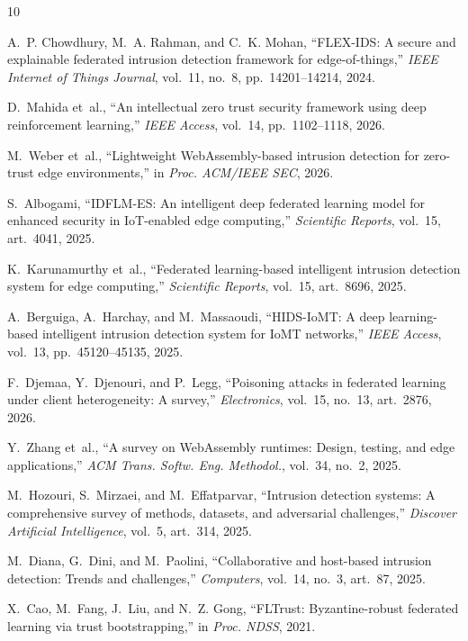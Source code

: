 \documentclass[11pt,a4paper]{article}
\begin{document}
\begin{thebibliography}{10}
\raggedright

A.~P. Chowdhury, M.~A. Rahman, and C.~K. Mohan, ``FLEX-IDS: A secure and explainable federated intrusion detection framework for edge-of-things,'' \emph{IEEE Internet of Things Journal}, vol.~11, no.~8, pp.~14201--14214, 2024.

D.~Mahida et~al., ``An intellectual zero trust security framework using deep reinforcement learning,'' \emph{IEEE Access}, vol.~14, pp.~1102--1118, 2026.

M.~Weber et~al., ``Lightweight WebAssembly-based intrusion detection for zero-trust edge environments,'' in \emph{Proc. ACM/IEEE SEC}, 2026.

S.~Albogami, ``IDFLM-ES: An intelligent deep federated learning model for enhanced security in IoT-enabled edge computing,'' \emph{Scientific Reports}, vol.~15, art.~4041, 2025.

K.~Karunamurthy et~al., ``Federated learning-based intelligent intrusion detection system for edge computing,'' \emph{Scientific Reports}, vol.~15, art.~8696, 2025.

A.~Berguiga, A.~Harchay, and M.~Massaoudi, ``HIDS-IoMT: A deep learning-based intelligent intrusion detection system for IoMT networks,'' \emph{IEEE Access}, vol.~13, pp.~45120--45135, 2025.

F.~Djemaa, Y.~Djenouri, and P.~Legg, ``Poisoning attacks in federated learning under client heterogeneity: A survey,'' \emph{Electronics}, vol.~15, no.~13, art.~2876, 2026.

Y.~Zhang et~al., ``A survey on WebAssembly runtimes: Design, testing, and edge applications,'' \emph{ACM Trans. Softw. Eng. Methodol.}, vol.~34, no.~2, 2025.

M.~Hozouri, S.~Mirzaei, and M.~Effatparvar, ``Intrusion detection systems: A comprehensive survey of methods, datasets, and adversarial challenges,'' \emph{Discover Artificial Intelligence}, vol.~5, art.~314, 2025.

M.~Diana, G.~Dini, and M.~Paolini, ``Collaborative and host-based intrusion detection: Trends and challenges,'' \emph{Computers}, vol.~14, no.~3, art.~87, 2025.

X.~Cao, M.~Fang, J.~Liu, and N.~Z. Gong, ``FLTrust: Byzantine-robust federated learning via trust bootstrapping,'' in \emph{Proc. NDSS}, 2021.

\end{thebibliography}
\end{document}
